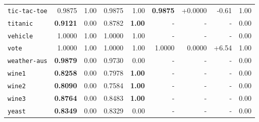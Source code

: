 \begin{tabular}{lrrrrrrrr}
\texttt{tic-tac-toe} & 0.9875 & 1.00 & 0.9875 & 1.00 & \textbf{0.9875} & +0.0000 & -0.61 & 1.00\\
\texttt{titanic} & \textbf{0.9121} & 0.00 & 0.8782 & \textbf{1.00} & - & - & - & 0.00\\
\texttt{vehicle} & 1.0000 & 1.00 & 1.0000 & 1.00 & - & - & - & 0.00\\
\texttt{vote} & 1.0000 & 1.00 & 1.0000 & 1.00 & 1.0000 & 0.0000 & +6.54 & 1.00\\
\texttt{weather-aus} & \textbf{0.9879} & 0.00 & 0.9730 & 0.00 & - & - & - & 0.00\\
\texttt{wine1} & \textbf{0.8258} & 0.00 & 0.7978 & \textbf{1.00} & - & - & - & 0.00\\
\texttt{wine2} & \textbf{0.8090} & 0.00 & 0.7584 & \textbf{1.00} & - & - & - & 0.00\\
\texttt{wine3} & \textbf{0.8764} & 0.00 & 0.8483 & \textbf{1.00} & - & - & - & 0.00\\
\texttt{yeast} & \textbf{0.8349} & 0.00 & 0.8329 & 0.00 & - & - & - & 0.00\\
\bottomrule
\end{tabular}
